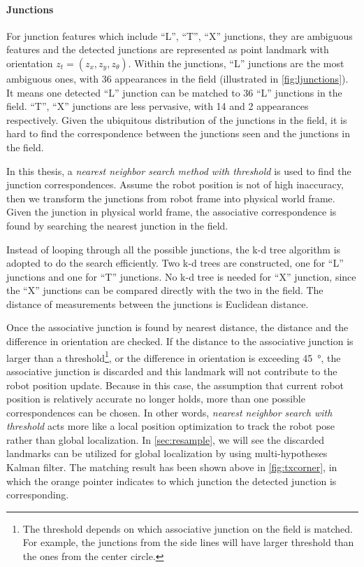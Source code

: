 \paragraph{Junctions}
For junction features which include ``L'', ``T'', ``X'' junctions, they are ambiguous features and the detected junctions are represented as point landmark with orientation $z_t = (z_x, z_y, z_{\theta})$. Within the junctions, ``L'' junctions are the most ambiguous ones, with 36 appearances in the field (illustrated in \autoref{fig:ljunctions}). It means one detected ``L'' junction can be matched to 36 ``L'' junctions in the field. ``T'', ``X'' junctions are less pervasive, with 14 and 2 appearances respectively. Given the ubiquitous distribution of the junctions in the field, it is hard to find the correspondence between the junctions seen and the junctions in the field. 

In this thesis, a \textit{nearest neighbor search method with threshold} is used to find the junction correspondences. Assume the robot position is not of high inaccuracy, then we transform the junctions from robot frame into physical world frame. Given the junction in physical world frame, the associative correspondence is found by searching the nearest junction in the field. 

Instead of looping through all the possible junctions, the k-d tree algorithm \cite{Bentley1975} is adopted to do the search efficiently. Two k-d trees are constructed, one for ``L'' junctions and one for ``T'' junctions. No k-d tree is needed for ``X'' junction, since the ``X'' junctions can be compared directly with the two in the field. The distance of measurements between the junctions is Euclidean distance. 

Once the associative junction is found by nearest distance, the distance and the difference in orientation are checked. If the distance to the associative junction is larger than a threshold\footnote{The threshold depends on which associative junction on the field is matched. For example, the junctions from the side lines will have larger threshold than the ones from the center circle.}, or the difference in orientation is exceeding \SI{45}{\degree}, the associative junction is discarded and this landmark will not contribute to the robot position update.
Because in this case, the assumption that current robot position is relatively accurate no longer holds, more than one possible correspondences can be chosen. In other words, \textit{nearest neighbor search with threshold} acts more like a local position optimization to track the robot pose rather than global localization. In \autoref{sec:resample}, we will see the discarded landmarks can be utilized for global localization by using multi-hypotheses Kalman filter. The matching result has been shown above in \autoref{fig:txcorner}, in which the orange pointer indicates to which junction the detected junction is corresponding.

